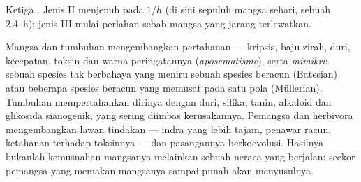 \begin{omfigure}

{\small Ketiga . Jenis II menjenuh pada $1/h$
(di sini sepuluh mangsa sehari, sebuah 
\qty{2.4}{h}); jenis III mulai perlahan sebab mangsa yang jarang
terlewatkan.}
\end{omfigure}

\begin{proposition}\label{prop:b1:species-interactions:defences}
Mangsa dan tumbuhan mengembangkan pertahanan --- kripsis, baju zirah,
duri, kecepatan, toksin dan warna peringatannya (\emph{aposematisme}),
serta \emph{mimikri}: sebuah spesies tak berbahaya yang meniru sebuah
spesies beracun (Batesian) atau beberapa spesies beracun yang memusat
pada satu pola (Müllerian). Tumbuhan mempertahankan dirinya dengan
duri, silika, tanin, alkaloid dan glikosida sianogenik, yang sering
diimbas kerusakannya. Pemangsa dan herbivora mengembangkan lawan
tindakan --- indra yang lebih tajam,  penawar racun, ketahanan
terhadap toksinnya --- dan pasangannya berkoevolusi. Hasilnya bukanlah
kemusnahan mangsanya melainkan sebuah neraca yang berjalan: seekor
pemangsa yang memakan mangsanya sampai punah akan menyusulnya.
\end{proposition}

